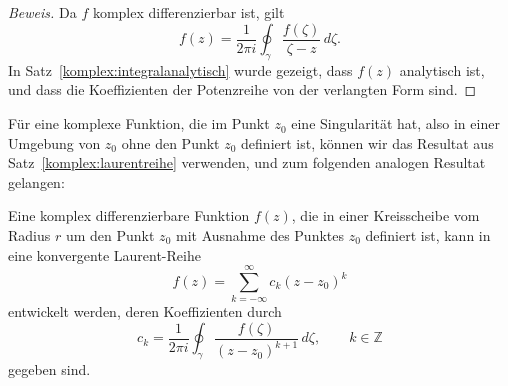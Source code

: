 \begin{proof}[Beweis]
Da $f$ komplex differenzierbar ist, gilt
\[
f(z)=\frac1{2\pi i}\oint_\gamma \frac{f(\zeta)}{\zeta-z}\,d\zeta.
\]
In Satz~\ref{komplex:integralanalytisch} wurde gezeigt, dass $f(z)$
analytisch ist, und dass die Koeffizienten der Potenzreihe von
der verlangten Form sind.
\end{proof}

Für eine komplexe Funktion, die im Punkt $z_0$ eine Singularität hat,
also in einer Umgebung von $z_0$ ohne den Punkt $z_0$ definiert ist,
können wir das Resultat aus Satz~\ref{komplex:laurentreihe} verwenden,
und zum folgenden analogen Resultat gelangen:

\begin{satz}
Eine komplex differenzierbare Funktion $f(z)$, die in einer Kreisscheibe
vom Radius $r$ um den Punkt $z_0$ mit Ausnahme des Punktes $z_0$
definiert ist, kann in eine konvergente Laurent-Reihe
\[
f(z)=\sum_{k=-\infty}^{\infty} c_k(z-z_0)^k
\]
entwickelt werden, deren Koeffizienten durch
\[
c_k = \frac1{2\pi i}\oint_\gamma \frac{f(\zeta)}{(z-z_0)^{k+1}}\,d\zeta,\qquad k\in\mathbb Z
\]
gegeben sind.
\end{satz}

